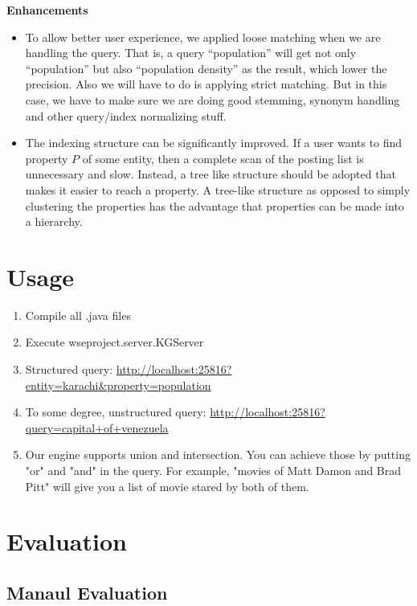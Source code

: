 \documentclass[11pt,twocolumn]{article}
\begin{document}
{\bf Enhancements}

\begin{itemize}
\item 
To allow better user experience, we applied loose matching when we are handling the query. That is, a query ``population'' will get not only ``population'' but also ``population density'' as the result, which lower the precision. Also we will have to do is applying strict matching. But in this case, we have to make sure we are doing good stemming, synonym handling and other query/index normalizing stuff.

\item 
The indexing structure can be significantly improved. If a user wants to find property $P$ of some entity, then a complete scan of the posting list is unnecessary and slow. Instead, a tree like structure should be adopted that makes it easier to reach a property. A tree-like structure as opposed to simply clustering the properties has the advantage that properties can be made into a hierarchy.

\end{itemize}




\section{Usage}
\begin{enumerate}
\item 
Compile all .java files 
\item 
Execute wseproject.server.KGServer
\item 
Structured query: \url {http://localhost:25816?entity=karachi\&property=population}
\item 
To some degree, unstructured query: \url {http://localhost:25816?query=capital+of+venezuela}
\item 
Our engine supports union and intersection. You can achieve those by putting "or" and "and" in the query. For example, "movies of Matt Damon and Brad Pitt" will give you a list of movie stared by both of them.
\end{enumerate}


\section{Evaluation}

\subsection{Manaul Evaluation}
\end{document}

